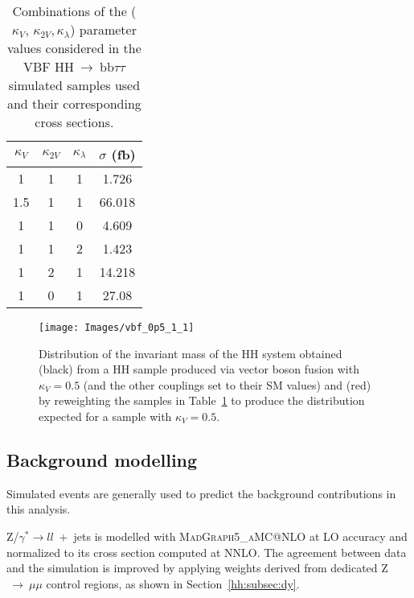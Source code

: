 \documentclass[../main.tex]{subfiles}
\begin{document}
\begin{table}[h!]
\begin{center}
\begin{tabular}{c | c | c | c}
$\kappa_V$ & $\kappa_{2V}$ & $\kappa_\lambda$ & $\sigma$ (fb) \\ \hline
1   & 1 & 1 & 1.726 \\
1.5 & 1 & 1 & 66.018 \\
1   & 1 & 0 & 4.609 \\
1   & 1 & 2 & 1.423 \\
1   & 2 & 1 & 14.218 \\
1   & 0 & 1 & 27.08
\end{tabular}
\caption{Combinations of the ($\kappa_V$, $\kappa_{2V}, \kappa_\lambda$) parameter values considered in the VBF HH$~\to~$bb$\tau\tau$ simulated samples used and their corresponding cross sections.}
\label{hh:analysis:vbf_samples}
\end{center}
\end{table}





\begin{figure}[h!]
\begin{center}
\texttt{[image: Images/vbf\_0p5\_1\_1]}
\end{center}
\caption{Distribution of the invariant mass of the HH system obtained (black) from a HH sample produced via vector boson fusion with $\kappa_{V}=0.5$ (and the other couplings set to their SM values) and (red) by reweighting the samples in Table~\ref{hh:analysis:vbf_samples} to produce the distribution expected for a sample with $\kappa_{V}=0.5$.}
\label{hh:fig:vbf_rew_test}
\end{figure}

\subsection{Background modelling}
\label{hh:subsec:bkg_modelling}

Simulated events are generally used to predict the background contributions in this analysis.

Z/$\gamma^*\to ll$~+~jets is modelled with \textsc{MadGraph5\_aMC@NLO} at LO accuracy and normalized to its cross section computed at NNLO. The agreement between data and the simulation is improved by applying weights derived from dedicated Z$~\to~\mu\mu$ control regions, as shown in Section~\ref{hh:subsec:dy}. 
\end{document}
